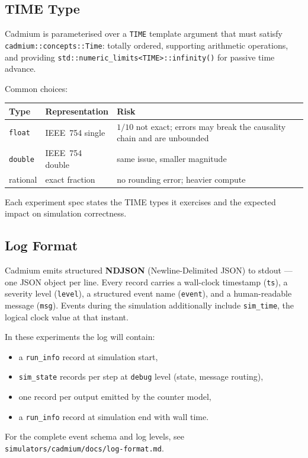 \subsection*{TIME Type}

Cadmium is parameterised over a \texttt{TIME} template argument that
must satisfy \texttt{cadmium::concepts::Time}: totally ordered,
supporting arithmetic operations, and providing
\texttt{std::numeric\_limits<TIME>::infinity()} for passive time advance.

Common choices:

{\small
\begin{center}
\begin{tabular}{@{}llp{5cm}@{}}
  \toprule
  Type & Representation & Risk \\
  \midrule
  \texttt{float}  & IEEE~754 single &
    $1/10$ not exact; errors may break the causality
    chain and are unbounded \\[4pt]
  \texttt{double} & IEEE~754 double &
    same issue, smaller magnitude \\[4pt]
  rational & exact fraction &
    no rounding error; heavier compute \\
  \bottomrule
\end{tabular}
\end{center}}

Each experiment spec states the TIME types it exercises and the expected
impact on simulation correctness.

\subsection*{Log Format}

Cadmium emits structured \textbf{NDJSON} (Newline-Delimited JSON) to
stdout --- one JSON object per line.  Every record carries a wall-clock
timestamp (\texttt{ts}), a severity level (\texttt{level}), a structured
event name (\texttt{event}), and a human-readable message (\texttt{msg}).
Events during the simulation additionally include \texttt{sim\_time},
the logical clock value at that instant.

In these experiments the log will contain:
\begin{itemize}
  \item a \texttt{run\_info} record at simulation start,
  \item \texttt{sim\_state} records per step at \texttt{debug} level
        (state, message routing),
  \item one record per output emitted by the counter model,
  \item a \texttt{run\_info} record at simulation end with wall time.
\end{itemize}

For the complete event schema and log levels, see
\texttt{simulators/cadmium/}\allowbreak\texttt{docs/log-format.md}.
